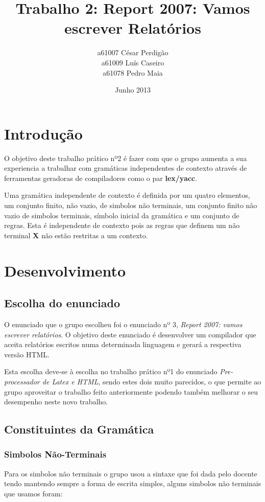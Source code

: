 \documentclass{report}
\title{Trabalho 2: Report 2007: Vamos escrever Relatórios}
\author{a61007 César Perdigão \\ a61009 Luís Caseiro \\ a61078 Pedro Maia}
\date{Junho 2013}
\begin{document}
\maketitle
\tableofcontents
\chapter{Introdução}
O objetivo deste trabalho prático nº2 é fazer com que o grupo aumenta a sua experiencia a trabalhar com gramáticas independentes de contexto através de ferramentas geradoras de compiladores como o par \textbf{lex/yacc}.

Uma  gramática independente de contexto é definida por um quatro elementos, um conjunto ﬁnito, não vazio, de simbolos não terminais, um conjunto ﬁnito não vazio de simbolos terminais, símbolo inicial da gramática e um conjunto de regras. Esta é independente de contexto pois as regras que deﬁnem um não terminal \textbf{X} não estão restritas a um contexto.

\chapter{Desenvolvimento}

\section{Escolha do enunciado}
O enunciado que o grupo escolheu foi o enunciado nº 3, \textit{Report 2007: vamos escrever relatórios}. O objetivo deste enunciado é desenvolver um compilador que aceita relatórios escritos numa determinada linguagem e gerará a respectiva versão HTML.

Esta escolha deve-se à escolha no trabalho prático nº1  do enunciado \textit{Pre-processador de Latex e HTML}, sendo estes dois muito parecidos, o que permite ao grupo aproveitar o trabalho feito anteriormente podendo também melhorar o seu desempenho neste novo trabalho.

\section{Constituintes da Gramática}

\subsection{Simbolos Não-Terminais}
Para os simbolos não terminais o grupo usou a sintaxe que foi dada pelo docente tendo  mantendo sempre a forma de escrita simples, alguns simbolos não terminais que usamos foram:
\end{document}

